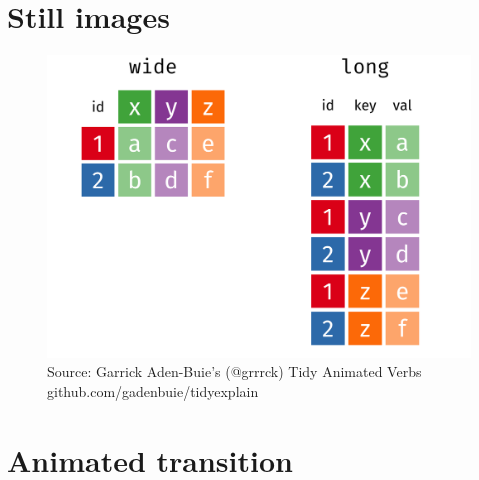 \documentclass[
  letterpaper,
  DIV=11,
  numbers=noendperiod]{scrreprt}
\begin{document}
\section{Still images}

\begin{figure}[H]

{\centering \includegraphics[width=1\textwidth,height=\textheight]{scripts/03_dataWrangling/wrangling-files/tidyr_pivot.png}

}

\caption{Source: Garrick Aden-Buie's (@grrrck) Tidy Animated Verbs
github.com/gadenbuie/tidyexplain}

\end{figure}%

\section{Animated transition}
\end{document}
